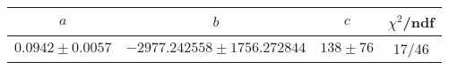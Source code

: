 \begin{tabular}{c|c|c|c}
$a$ & $b$ & $c$ & $\chi^2$/ndf \\
\hline
$0.0942\pm0.0057$ & $-2977.242558\pm1756.272844$ & $138\pm76$ & 17/46
\end{tabular}
